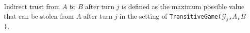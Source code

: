 {}
\begin{definition}
  Indirect trust from $A$ to $B$ after turn $j$ is defined as the maximum possible value that can be stolen from
  $A$ after turn $j$ in the setting of \texttt{TransitiveGame(}$\mathcal{G}_j$\texttt{,}$A$\texttt{,}$B$\texttt{)}.
\end{definition}
